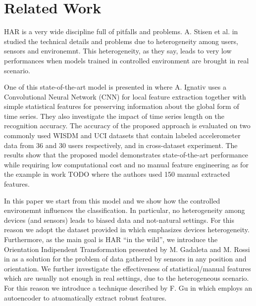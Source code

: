 
\section{Related Work}
\label{sec:related-work}

HAR is a very wide discipline full of pitfalls and problems. A. Stisen et al. in \cite{stisen2015smart} studied the
technical details and problems due to heterogeneity among users,
sensors and environemnt. This heterogeneity, as they say, leads to
very low performances when models trained in controlled environment
are brought in real scenario.

One of this state-of-the-art model is presented in
\cite{ignatov2018real} where A. Ignativ uses a Convolutional Neural
Network (CNN) for local feature extraction together with simple statistical
features for preserving information about the global form of time
series. They also investigate the impact of time series length on the
recognition accuracy. The accuracy of the proposed approach is
evaluated on two commonly used WISDM and UCI datasets that contain
labeled accelerometer data from 36 and 30 users respectively, and in
cross-dataset experiment. The results show that the proposed model
demonstrates state-of-the-art performance while requiring low
computational cost and no manual feature engineering as for the example in work TODO where the authors used 150 manual extracted features.

In this paper we start from this model and we show how the controlled
environemnt influences the classification. In particular, no
heterogeneity among devices (and sensors) leads to biased data and
not-natural settings.  For this reason we adopt the dataset provided
in \cite{stisen2015smart} which emphasizes devices heterogeneity.
Furthermore, as the main goal is HAR ``in the wild'', we introduce the
Orientation Indipendent Transformation presented by M. Gadaleta and
M. Rossi in \cite{gadaleta2018idnet} as a solution for the problem of
data gathered by sensors in any position and orientation. We further investigate the
effectiveness of statistical/manual features which are usually not
enough in real settings, due to the heterogeneous scenario. For this
reason we introduce a technique described by F. Gu in
\cite{gu2018locomotion} which employs an autoencoder to atuomatically
extract robust features.
